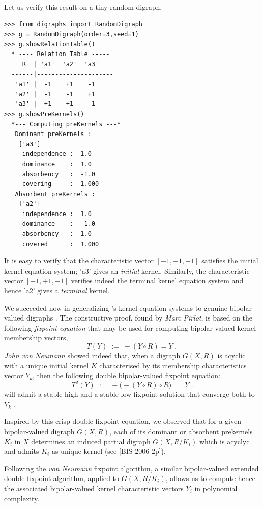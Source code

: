 Let us verify this result on a tiny random digraph.
\begin{lstlisting}
>>> from digraphs import RandomDigraph
>>> g = RandomDigraph(order=3,seed=1)
>>> g.showRelationTable()
  * ---- Relation Table -----
     R  | 'a1'  'a2'  'a3'	  
  ------|---------------------
   'a1' |  -1    +1    -1	 
   'a2' |  -1    -1    +1	 
   'a3' |  +1    +1    -1	 
>>> g.showPreKernels()
  *--- Computing preKernels ---*
   Dominant preKernels :
    ['a3']
     independence :  1.0
     dominance    :  1.0
     absorbency   :  -1.0
     covering     :  1.000
   Absorbent preKernels :
    ['a2']
     independence :  1.0
     dominance    :  -1.0
     absorbency   :  1.0
     covered      :  1.000
\end{lstlisting}
It is easy to verify that the characteristic vector $[-1, -1, +1]$ satisfies the initial kernel equation system; 'a3' gives an \emph{initial} kernel. Similarly, the characteristic vector $[-1, +1, -1]$ verifies indeed the terminal kernel equation system and hence 'a2' gives a \emph{terminal} kernel.

We succeeded now in generalizing \Berge's kernel equation systems to genuine bipolar-valued digraphs \citep{BIS-2006b}. The constructive proof, found by \emph{Marc Pirlot}, is based on the following \emph{fixpoint equation} that may be used for computing bipolar-valued kernel membership vectors,
\begin{equation}\label{eq:17.4}
T(Y) \; := \; -(Y \circ R) = Y\;,
\end{equation}
\emph{John von Neumann} showed indeed that, when a digraph $G(X,R)$ is acyclic with a unique initial kernel $K$ characterised by its membership characteristics vector $Y_k$, then the following double bipolar-valued fixpoint equation:
\begin{equation}\label{eq:17.5}
T^2(Y) \; := \; -\big( -(Y \circ R) \circ R) \; = \; Y\;.
\end{equation}
will admit a stable high and a stable low fixpoint solution that converge both to $Y_k$ \citep{SCH-1985}.

Inspired by this crisp double fixpoint equation, we observed that for a given bipolar-valued digraph $G(X,R)$, each of its dominant or absorbent prekernels $K_i$ in $X$ determines an induced partial digraph $G(X,R/K_i)$ which is acyclyc and admits $K_i$ as unique kernel (see [BIS-2006-2p]).

Following the \emph{von Neumann} fixpoint algorithm, a similar bipolar-valued extended double fixpoint algorithm, applied to $G(X,R/K_i)$, allows us to compute hence the associated bipolar-valued kernel characteristic vectors $Y_i$ in polynomial complexity.

